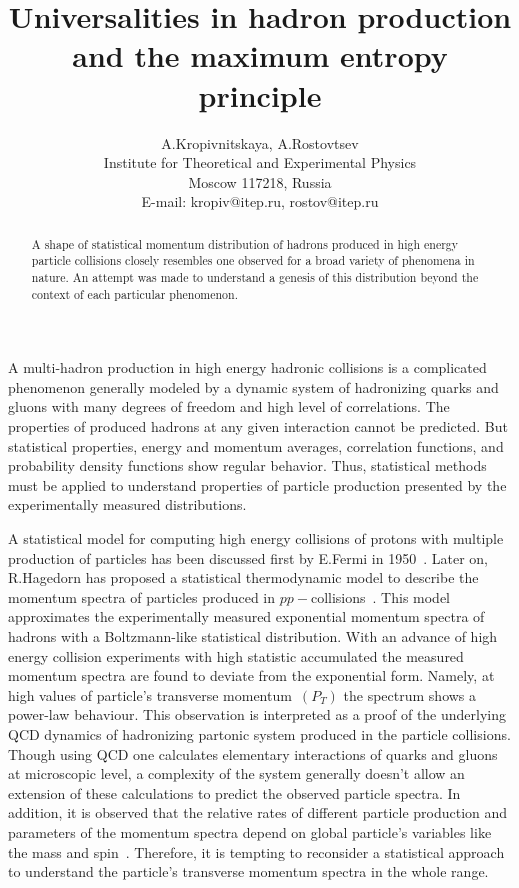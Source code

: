 \documentclass[10pt,twoside]{hsqcd}
\begin{document}
\title{Universalities in hadron production and the maximum entropy 
principle}

\author{A.Kropivnitskaya, A.Rostovtsev \\
Institute for Theoretical and Experimental Physics \\
Moscow 117218, Russia\\
E-mail: kropiv@itep.ru, rostov@itep.ru }

\maketitle

\begin{abstract}
A shape of statistical momentum distribution of hadrons produced in high 
energy particle collisions closely resembles one observed for a broad 
variety of phenomena in nature. An attempt was made to understand a 
genesis of this distribution beyond the context of each particular 
phenomenon.
\end{abstract}


A multi-hadron production in high energy hadronic collisions is a 
complicated phenomenon generally modeled by a dynamic system of 
hadronizing quarks and gluons with many degrees of freedom and high level 
of correlations. The properties of produced hadrons at any given 
interaction cannot be predicted. But statistical properties, energy and 
momentum averages, correlation functions, and probability density 
functions show regular behavior. Thus, statistical methods must be applied 
to understand properties of particle production presented by the 
experimentally measured  distributions. 

A statistical model for computing high energy collisions of protons with 
multiple production of particles has been discussed first by E.Fermi in 
1950~\cite{Fermi}. Later on, R.Hagedorn has proposed a statistical 
thermodynamic model to describe the momentum spectra of particles produced 
in $pp-$collisions~\cite{Hagedorn}. This model approximates the 
experimentally measured exponential momentum spectra of hadrons with a 
Boltzmann-like statistical distribution.
With an advance of high energy collision experiments with high statistic 
accumulated the measured momentum spectra are found to deviate from the 
exponential form. Namely, at high values of  particle's transverse 
momentum~$(P_T)$ the spectrum shows a power-law behaviour. This 
observation is interpreted as a proof of the underlying QCD dynamics of 
hadronizing partonic system produced in the particle collisions. Though 
using QCD one calculates elementary interactions of quarks and gluons at 
microscopic level, a complexity of the system generally doesn't allow an 
extension of these calculations to predict the observed particle spectra. 
In addition, it is observed that the relative rates of different particle 
production and parameters of the momentum spectra depend on global 
particle's variables like the mass and spin~\cite{LEP, HERA}. Therefore, 
it is tempting to reconsider a statistical approach to understand the 
particle's transverse momentum spectra in the whole range. 
\end{document}
